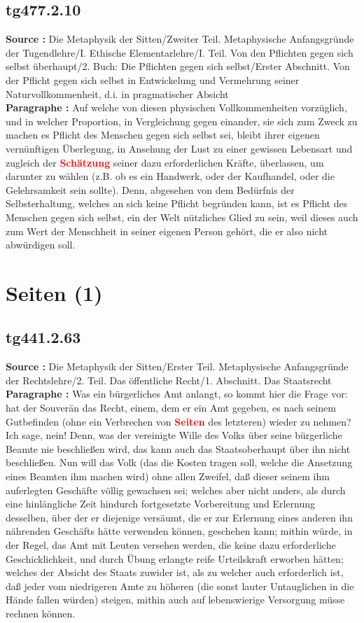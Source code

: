\documentclass[a4paper,12pt,twoside]{book}
\newcommand{\match}[1]{\textcolor{red}{\textbf{#1}}}
\newcommand{\unnumberedsection}[1]{
	\section*{#1}
	\addcontentsline{toc}{section}{#1}
	\markright{#1}
}
\begin{document}
	\subsection*{tg477.2.10} 
	\textbf{Source : }Die Metaphysik der Sitten/Zweiter Teil. Metaphysische Anfangsgründe der Tugendlehre/I. Ethische Elementarlehre/I. Teil. Von den Pflichten gegen sich selbst überhaupt/2. Buch: Die Pflichten gegen sich selbst/Erster Abschnitt. Von der Pflicht gegen sich selbst in Entwickelung und Vermehrung seiner Naturvollkommenheit, d.i. in pragmatischer Absicht\\  
	
	\textbf{Paragraphe : }Auf welche von diesen physischen Vollkommenheiten vorzüglich, und in welcher Proportion, in Vergleichung gegen einander, sie sich zum Zweck zu machen es Pflicht des Menschen gegen sich selbst sei, bleibt ihrer eigenen vernünftigen Überlegung, in Ansehung der Lust zu einer gewissen Lebensart und zugleich der \match{Schätzung} seiner dazu erforderlichen Kräfte, überlassen, um darunter zu wählen (z.B. ob es ein Handwerk, oder der Kaufhandel, oder die  Gelehrsamkeit sein sollte). Denn, abgesehen von dem Bedürfnis der Selbsterhaltung, welches an sich keine Pflicht begründen kann, ist es Pflicht des Menschen gegen sich selbst, ein der Welt nützliches Glied zu sein, weil dieses auch zum Wert der Menschheit in seiner eigenen Person gehört, die er also nicht abwürdigen soll. 
	
	\unnumberedsection{Seiten (1)} 
	\subsection*{tg441.2.63} 
	\textbf{Source : }Die Metaphysik der Sitten/Erster Teil. Metaphysische Anfangsgründe der Rechtslehre/2. Teil. Das öffentliche Recht/1. Abschnitt. Das Staatsrecht\\  
	
	\textbf{Paragraphe : }Was ein bürgerliches Amt anlangt, so kommt hier die Frage vor: hat der Souverän das Recht, einem, dem er ein Amt gegeben, es nach seinem Gutbefinden (ohne ein Verbrechen von \match{Seiten} des letzteren) wieder zu nehmen? Ich sage, nein! Denn, was der vereinigte Wille des Volks über seine bürgerliche Beamte nie beschließen wird, das kann auch das Staatsoberhaupt über ihn nicht beschließen. Nun will das Volk (das die Kosten tragen soll, welche die Ansetzung eines Beamten ihm machen wird) ohne allen Zweifel, daß dieser seinem ihm auferlegten Geschäfte völlig gewachsen sei; welches aber nicht anders, als durch eine hinlängliche Zeit hindurch fortgesetzte Vorbereitung und Erlernung desselben, über der er diejenige versäumt, die er zur Erlernung eines anderen ihn nährenden Geschäfts hätte verwenden können, geschehen kann; mithin würde, in der Regel, das Amt mit Leuten versehen werden, die keine dazu erforderliche Geschicklichkeit, und durch Übung erlangte reife Urteilskraft erworben hätten; welches der Absicht des Staats zuwider ist, als zu welcher auch erforderlich ist, daß jeder vom niedrigeren Amte zu höheren (die sonst lauter Untauglichen in die Hände fallen würden) steigen, mithin auch auf lebenswierige Versorgung müsse rechnen können. 
	
\end{document}
